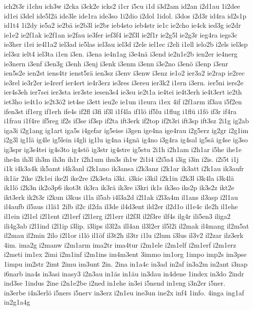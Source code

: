 {ich2t3r
i1chu
ich3w
i2cka
i3ck2e
icks2
i1cr
i5cu
i1d
i3d2am
id2an
i2d1au
1i2dee
id1ei
i3del
ide5l2ä
ide3le
ide1ra
ide3so
1i2dio
i2dol
1idol.
i3dos
i2d3r
id4ra
id2s1p
id1t4
1i2dy
ie5a2
ie2bä
ie2b3l
ie2br
ieb4sto
ieb4str
ie1c
ie2cho
ie4ck
ied3g
ie2dr
ie1e2
ie2f1ak
ie2f1an
ie2fau
ie3fer
ief3f4
ie2f3l
ie2f1r
ie2g5l
ie2g3r
ieg4ra
iegs3c
ie3her
i1ei
ie4l1a2
iel3ad
ie5las
iel3au
iel3d
i2ele
iel1ec
i2eli
i1ell
ielo2b
i2els
iel3sp
iel3sz
ielt4
iel3ta
i1en
i3en.
i3ena
ie4n1ag
i3e4nä
i3end
ie2n1e2b
ien2er
ie4nerg
ie3nern
i3enf
i3en3g
i3enh
i3enj
i3enk
i3enm
i3enn
i3e2no
i3enö
i3enp
i3enr
ien5s2e
ien2st
iens4tr
ienst5rä
ien3sz
i3env
i3enw
i3enz
ie1o2
ier3a2
ie2rap
ie2rec
ie3rel
ie3r2er
ie4rerf
ier4ert
ie4r3erz
ie3res
i3ereu
ier3k2
i1ern
i3ern.
ier5ni
iers2e
ier4s3eh
ier7sei
ier3sta
ier3ste
iesen3s4
ie3su
ie2t1a
ie4tei
ie4t3erh
ie4t3ert
ie2th
iet3ho
ie4t1o
ie2t3ö2
iet4se
i3ett
ieu2e
ie1un
i1eura
i1ex
4if
i2f1arm
if3au
i5f2en
ifen3st
if1erg
if1erh
ife4s
if2fl
i3fi
if3l
i1f4la
if1lö
if5lu
i1flug
i1flü
i1fö
if3r
if4ra
i1frau
i1f4re
if5reg
if2s
if3se
if3sp
if2ta
ift3erk
if2top
if2t3ri
ift3sp
ift3sz
2i1g
ig2ab
iga3i
i2g1ang
ig1art
iga5s
i4gefar
ig5eise
i3gen
ige4na
ige4rau
i2g5erz
ig2gr
i2g1im
i2g3l
ig1lä
ig4le
ig5lein
i4gli
ig1lu
ig4na
i4gnä
ig4no
i3g4ra
ig4sal
ig5sä
ig4se
ig3so
ig3spr
ig3s4tei
ig4s3to
ig4stö
ig3str
ig4stre
ig5stu
2i1h
i2h1am
i2h1ar
i5he
ihe1e
ihe4n
ih3l
ih3m
ih3n
ih1r
i2h1um
ihu3s
ih1w
2i1i4
i2i5a4
i3ig
i3in
i2is.
i2i5t
i1j
i1k
i4k3a4k
ik5amt
i4k3anl
i2k1ano
ik3ansa
i2k3anz
i2k1ar
ik3att
i2k1au
ik3aufr
ik1är
2ike
i2k1ei
ike2l
ike2re
i2k3eta
i3ki.
i3kic
i3kil
i2k1in
i2k3l
i3k4la
i3k4lä
ik1lö
i2k3n
ik2o3p6
ikot3t
ik3ra
ik3rä
ik3re
i3kri
ik1s
ik3so
iks2p
ik3s2z
ikt2e
ikt3erk
ik2t3r
i2kun
i3kus
i1la
il5ab
i4l3a2d
i2l1ak
i2l3a4m
il1ans
il3asp
i2l1au
il4aufb
il5aus
i1lä1
2ilb
il2c
il2da
il3de
il4d3ent
ild2er
il2d1o
il1e4c
ile2h
il1ehe
il1ein
i2l1el
i2l1ent
i2l1erf
i2l1erg
i2l1err
il2f3l
il2f3re
ilf4s
ilg4r
ili5en3
iliga2
ili4g3ab
i2l1ind
i2l1ip
i3lip.
i3lips
il3l2a
ill4an
il3l2er
il5l2i
il2mak
il4mang
il2m5at
il2mau
il2min
2ilo
i2l1or
i1lö
il1öf
il3t2h
il3tr
i1lu
i2lum
i3lus
il3v2
il2zar
ilz3erk
4im.
ima2g
i2manw
i2m1arm
ima2tr
ima4tur
i2m1ele
i2m1elf
i2m1erf
i2m1erz
i2meti
im1ex
2imi
i2m1inf
i2m1ins
im4m3ent
3immo
im1org
1impo
imp2s
im3pse
1impu
im2str
2imt
2imu
im3unt
2in.
2ina
in1a4c
in3ad
in2af
in3a2m
in2ant
i3nap
i6narb
ina4s
in3asi
inasy3
i2n3au
in1äs
in1äu
in3dau
in4dene
1index
in3do
2indr
ind3se
1indus
2ine
i2n1e2be
i2ned
in1ehe
in3ei
i5nend
in1eng
i3n2er
i5ner.
in3erbe
i4n3erlö
i5ners
i5nerv
in3erz
i2n1eu
ine3un
ine2x
inf4
1info.
4inga
ing1af
in2g1a4g
}
